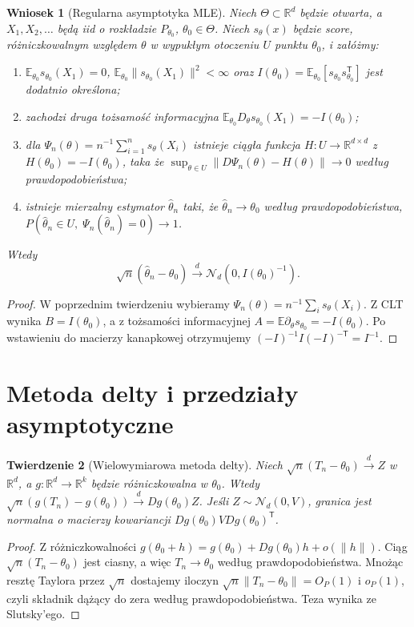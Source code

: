 \documentclass[11pt,a4paper,oneside]{report}
\numberwithin{equation}{chapter}
\theoremstyle{plain}
\newtheorem{twierdzenie}{Twierdzenie}[chapter]
\newtheorem{wniosek}[twierdzenie]{Wniosek}
\theoremstyle{definition}
\theoremstyle{remark}
\newcommand{\R}{\mathbb R}
\newcommand{\E}{\mathbb E}
\newcommand{\Normal}{\mathcal N}
\begin{document}
\begin{wniosek}[Regularna asymptotyka MLE]
\label{cor:mle-asymptotic}
Niech $\Theta\subset\R^d$ będzie otwarta, a
$X_1,X_2,\ldots$ będą iid o rozkładzie $P_{\theta_0}$,
$\theta_0\in\Theta$. Niech $s_\theta(x)$ będzie score,
różniczkowalnym względem $\theta$ w wypukłym otoczeniu
$U$ punktu $\theta_0$, i załóżmy:
\begin{enumerate}
\item $\E_{\theta_0}s_{\theta_0}(X_1)=0$,
$\E_{\theta_0}\|s_{\theta_0}(X_1)\|^2<\infty$ oraz
$I(\theta_0)=\E_{\theta_0}[s_{\theta_0}s_{\theta_0}^{\mathsf T}]$
jest dodatnio określona;
\item zachodzi druga tożsamość informacyjna
$\E_{\theta_0}D_\theta s_{\theta_0}(X_1)=-I(\theta_0)$;
\item dla $\Psi_n(\theta)=n^{-1}\sum_{i=1}^n s_\theta(X_i)$
istnieje ciągła funkcja $H:U\to\R^{d\times d}$ z
$H(\theta_0)=-I(\theta_0)$, taka że
$\sup_{\theta\in U}\|D\Psi_n(\theta)-H(\theta)\|\to0$
według prawdopodobieństwa;
\item istnieje mierzalny estymator $\widehat\theta_n$ taki,
że $\widehat\theta_n\to\theta_0$ według prawdopodobieństwa,
$P(\widehat\theta_n\in U,\;\Psi_n(\widehat\theta_n)=0)\to1$.
\end{enumerate}
Wtedy
\[
\sqrt n(\widehat\theta_n-\theta_0)
\xrightarrow{d}\Normal_d(0,I(\theta_0)^{-1}).
\]
\end{wniosek}
\begin{proof}
W poprzednim twierdzeniu wybieramy $\Psi_n(\theta)=
n^{-1}\sum_i s_\theta(X_i)$. Z CLT wynika $B=I(\theta_0)$,
a z tożsamości informacyjnej
$A=\E\partial_\theta s_{\theta_0}=-I(\theta_0)$.
Po wstawieniu do macierzy kanapkowej otrzymujemy
$(-I)^{-1}I(-I)^{-\mathsf T}=I^{-1}$.
\end{proof}

\section{Metoda delty i przedziały asymptotyczne}
\begin{twierdzenie}[Wielowymiarowa metoda delty]
Niech $\sqrt n(T_n-\theta_0)\xrightarrow{d}Z$ w $\R^d$,
a $g:\R^d\to\R^k$ będzie różniczkowalna w $\theta_0$.
Wtedy
$\sqrt n(g(T_n)-g(\theta_0))\xrightarrow{d}Dg(\theta_0)Z$.
Jeśli $Z\sim\Normal_d(0,V)$, granica jest normalna o macierzy
kowariancji $Dg(\theta_0)V Dg(\theta_0)^{\mathsf T}$.
\end{twierdzenie}
\begin{proof}
Z różniczkowalności
$g(\theta_0+h)=g(\theta_0)+Dg(\theta_0)h+o(\|h\|)$.
Ciąg $\sqrt n(T_n-\theta_0)$ jest ciasny, a więc
$T_n\to\theta_0$ według prawdopodobieństwa.
Mnożąc resztę Taylora przez $\sqrt n$ dostajemy iloczyn
$\sqrt n\|T_n-\theta_0\|=O_P(1)$ i
$o_P(1)$, czyli składnik dążący do zera według
prawdopodobieństwa. Teza wynika ze Slutsky'ego.
\end{proof}
\end{document}
